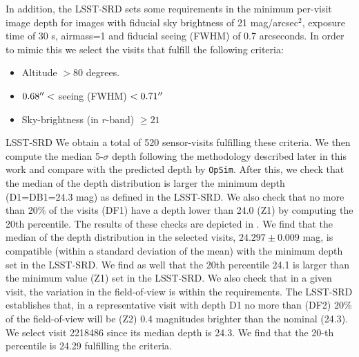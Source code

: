 \documentclass[twocolumn]{aastex62}
\begin{document}
In addition, the LSST-SRD sets some requirements in the minimum per-visit image depth for images with fiducial sky brightness of 21 mag/arcsec$^2$, exposure time of 30 s, airmass=1 and fiducial seeing (FWHM) of 0.7 arcseconds. In order to mimic this we select the visits that fulfill the following criteria:
\begin{itemize}
\item Altitude $> 80$ degrees.
\item $0.68\mbox{$^{\prime\prime}$} <$ seeing (FWHM) $ < 0.71\mbox{$^{\prime\prime}$}$
\item Sky-brightness (in $r$-band) $ \geq 21$ 
\end{itemize}LSST-SRD
We obtain a total of 520 sensor-visits fulfilling these criteria. We then compute the median 5-$\sigma$ depth following the methodology described later in this work and compare with the predicted depth by \texttt{OpSim}. After this, we check that the median of the depth distribution is larger the minimum depth (D1=DB1=24.3 mag) as defined in the LSST-SRD. We also check that no more than 20\% of the visits (DF1) have a depth lower than 24.0 (Z1) by computing the 20th percentile. The results of these checks are depicted in . We find that the median of the depth distribution in the selected visits, $24.297 \pm 0.009$ mag, is compatible (within a standard deviation of the mean) with the minimum depth set in the LSST-SRD. We find as well that the 20th percentile 24.1 is larger than the minimum value (Z1) set in the LSST-SRD. We also check that in a given visit, the variation in the field-of-view is within the requirements. The LSST-SRD establishes that, in a representative visit with depth D1 no more than (DF2) 20\% of the field-of-view will be (Z2) 0.4 magnitudes brighter than the nominal (24.3). We select visit 2218486 since its median depth is 24.3. We find that the 20-th percentile is 24.29 fulfilling the criteria.
\end{document}
